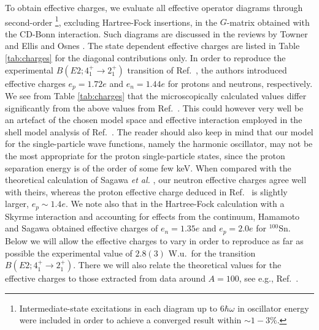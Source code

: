To obtain effective charges, we 
evaluate all effective operator diagrams through second-order
\footnote{Intermediate-state excitations in each diagram
up to $6\hbar\omega$ in oscillator energy were included
in order to achieve a converged result within $\sim 1-3 \%$.},
excluding Hartree-Fock insertions,  in the 
$G$-matrix obtained with  the CD-Bonn interaction. Such diagrams 
are discussed in the reviews by Towner \cite{towner87} 
and Ellis and Osnes \cite{eo77}.   
The state dependent effective charges are listed in Table
\ref{tab:charges} for the diagonal contributions only.
In order to reproduce the experimental $B(E2;4_1^+\rightarrow 2_1^+)$
transition of Ref.\ \cite{sb106}, the authors introduced 
effective charges $e_p=1.72e$ and
$e_n=1.44e$ for protons and neutrons, respectively.
We see from Table \ref{tab:charges} that the microscopically calculated
values differ significantly from the above values
from  Ref.\ \cite{sb106}. This
could however very well be an artefact of the chosen model space and 
effective interaction employed in the shell model analysis of
Ref.\ \cite{sb106}. The reader should also keep in mind that our
model for the single-particle wave functions, namely the 
harmonic oscillator, may not be the most appropriate for the proton
single-particle states, 
since the proton separation energy is of the order of some
few keV. 
When compared with the theoretical calculation of Sagawa {\em et al.} \cite{ssbw87},
our neutron effective charges agree well with theirs, whereas the proton effective charge
deduced in Ref.\ \cite{ssbw87} is slightly larger, $e_p\sim 1.4e$. We note also that in the 
Hartree-Fock calculation with a Skyrme interaction and 
accounting for effects from the continuum, 
Hamamoto and Sagawa \cite{hs97} obtained
effective charges of $e_n=1.35e$  and $e_p=2.0e$ for $^{100}$Sn. 
Below we will allow the effective charges
to vary in order to  reproduce as far as possible
the  experimental value of $2.8(3)$ W.u.\  for the transition 
$B(E2;4_1^+\rightarrow 2_1^+)$. There we will also relate the theoretical
values for the effective charges to those extracted from data
around $A=100$, see e.g., Ref.\ \cite{matej}.



